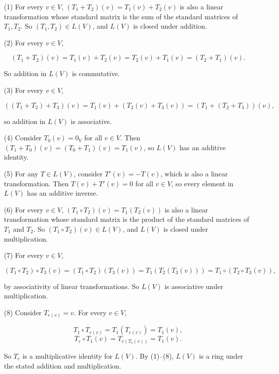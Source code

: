 (1) For every \(v \in V\), \(\left( {T_{1} + T_{2}} \right)(v) = T_{1}(v) + T_{2}(v)\) is also a linear transformation whose standard matrix is the sum of the standard matrices of \(T_{1},T_{2}\). So \(\left( {T_{1},T_{2}} \right) \in L(V)\), and \(L(V)\) is closed under addition.

(2) For every \(v \in V\),

\[\left( {T_{1} + T_{2}} \right)(v) = T_{1}(v) + T_{2}(v) = T_{2}(v) + T_{1}(v) = \left( {T_{2} + T_{1}} \right)(v).\]

So addition in \(L(V)\) is commutative.

(3) For every \(v \in V\),

\[\left( {\left( {T_{1} + T_{2}} \right) + T_{3}} \right)(v) = T_{1}(v) + \left( {T_{2}(v) + T_{3}(v)} \right) = \left( {T_{1} + \left( {T_{2} + T_{3}} \right)} \right)(v),\]

so addition in \(L(V)\) is associative.

(4) Consider \(T_{0}(v) = 0_{V}\) for all \(v \in V\). Then \(\left( {T_{1} + T_{0}} \right)(v) = \left( {T_{0} + T_{1}} \right)(v) = T_{1}(v)\), so \(L(V)\) has an additive identity.

(5) For any \(T \in L(V)\), consider \(T'(v) = - T(v)\), which is also a linear transformation. Then \(T(v) + T'(v) = 0\) for all \(v \in V\), so every element in \(L(V)\) has an additive inverse.

(6) For every \(v \in V\), \(\left( {T_{1} \circ T_{2}} \right)(v) = T_{1}\left( {T_{2}(v)} \right)\) is also a linear transformation whose standard matrix is the product of the standard matrices of \(T_{1}\) and \(T_{2}\). So \(\left( {T_{1} \circ T_{2}} \right)(v) \in L(V)\), and \(L(V)\) is closed under multiplication.

(7) For every \(v \in V\),

\[\left( {T_{1} \circ T_{2}} \right) \circ T_{3}(v) = \left( {T_{1} \circ T_{2}} \right)\left( {T_{3}(v)} \right) = T_{1}\left( {T_{2}\left( {T_{3}(v)} \right)} \right) = T_{1} \circ \left( {T_{2} \circ T_{3}(v)} \right),\]

by associativity of linear transformations. So \(L(V)\) is associative under multiplication.

(8) Consider \(T_{e{(v)}} = v\). For every \(v \in V\),

\[T_{1} \circ T_{e{(v)}} = T_{1}\left( T_{e{(v)}} \right) = T_{1}(v),\]\[T_{e} \circ T_{1}(v) = T_{e{({T_{1}{(v)}})}} = T_{1}(v).\]

So \(T_{e}\) is a multiplicative identity for \(L(V)\). By (1)--(8), \(L(V)\) is a ring under the stated addition and multiplication.

